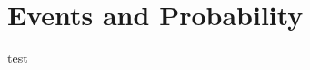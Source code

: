 \documentclass[main.tex]{subfiles}
\begin{document}
\section{Events and Probability}

test
\end{document}
